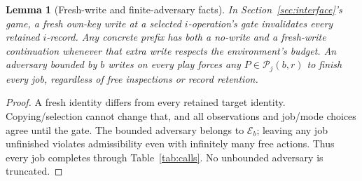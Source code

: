 \documentclass[acmsmall,screen,review,anonymous]{acmart}
\newtheorem{lemma}{Lemma}
\begin{document}
\begin{lemma}[Fresh-write and finite-adversary facts]
\label{lem:inspection}
In Section~\ref{sec:interface}'s game, a fresh own-key write at a selected $i$-operation's gate invalidates every retained $i$-record. Any concrete prefix has both a no-write and a fresh-write continuation whenever that extra write respects the environment's budget. An adversary bounded by $b$ writes on every play forces any $P\in\mathcal P_j(b,r)$ to finish every job, regardless of free inspections or record retention.
\end{lemma}
\begin{proof}
A fresh identity differs from every retained target identity. Copying/selection cannot change that, and all observations and job/mode choices agree until the gate. The bounded adversary belongs to $\mathcal E_b$; leaving any job unfinished violates admissibility even with infinitely many free actions. Thus every job completes through Table~\ref{tab:calls}. No unbounded adversary is truncated.

\end{proof}
\end{document}
